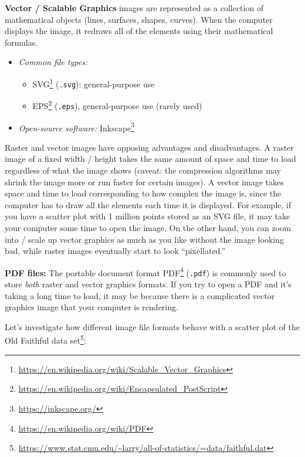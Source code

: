 \documentclass[
]{krantz}
\providecommand{\tightlist}{%
  \setlength{\itemsep}{0pt}\setlength{\parskip}{0pt}}
\renewenvironment{quote}{\begin{VF}}{\end{VF}}
\renewcommand{\href}[2]{#2\footnote{\url{#1}}}
\begin{document}
\textbf{Vector / Scalable Graphics} images are represented as a collection of mathematical objects (lines, surfaces, shapes, curves). When the computer displays the image, it redraws all of the elements using their mathematical formulas.

\begin{itemize}
\tightlist
\item
  \emph{Common file types:}

  \begin{itemize}
  \tightlist
  \item
    \href{https://en.wikipedia.org/wiki/Scalable_Vector_Graphics}{SVG} (\texttt{.svg}): general-purpose use
  \item
    \href{https://en.wikipedia.org/wiki/Encapsulated_PostScript}{EPS} (\texttt{.eps}), general-purpose use (rarely used)
  \end{itemize}
\item
  \emph{Open-source software:} \href{https://inkscape.org/}{Inkscape}
\end{itemize}

Raster and vector images have opposing advantages and disadvantages. A raster image of a fixed width / height takes the same amount of space and time to load regardless of
what the image shows (caveat: the compression algorithms may shrink the image more or run faster for certain images). A vector image takes space and time to load
corresponding to how complex the image is, since the computer has to draw all the elements each time it is displayed. For example, if you have a scatter plot with 1 million
points stored as an SVG file, it may take your computer some time to open the image. On the other hand, you can zoom into / scale up
vector graphics as much as you like without the image looking bad, while raster images eventually start to look ``pixellated.''

\begin{quote}
\textbf{PDF files:}
The portable document format \href{https://en.wikipedia.org/wiki/PDF}{PDF} (\texttt{.pdf}) is commonly used to
store \emph{both} raster and vector graphics formats. If you try to open a PDF and it's taking a long time
to load, it may be because there is a complicated vector graphics image that your computer is rendering.
\end{quote}

Let's investigate how different image file formats behave with a scatter plot of the
\href{https://www.stat.cmu.edu/~larry/all-of-statistics/=data/faithful.dat}{Old Faithful data set}:
\end{document}
